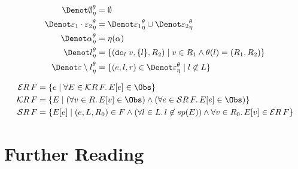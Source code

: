 \begin{alignat*}{2}
  \DenotEnv{\emptyset} & = \emptyset \\
  \DenotEnv{\varepsilon_1 \cdot \varepsilon_2} & = \DenotEnv{\varepsilon_1} \cup \DenotEnv{\varepsilon_2} \\
  \DenotEnv{\alpha} & = \eta(\alpha) \\
  \DenotEnv{l} & = \{(\Do{l}{v}, \{l\}, R_2) \mid v \in R_1 \land \theta(l) = (R_1, R_2) \} \\
  \DenotEnv{\varepsilon \setminus l} & = \{(e, l, r) \in \DenotEnv{\varepsilon} \mid l \not\in L\}
\end{alignat*}

\begin{alignat*}{2}
  \mathcal{E}R\,F & = \{e \mid \forall E \in \mathcal{K}R\,F \ldotp E[e] \in \Obs\} \\
  \mathcal{K}R\,F & = \{E \mid (\forall v \in R \ldotp E[v] \in \Obs) \land (\forall e \in \mathcal{S}R\,F \ldotp E[e] \in \Obs)\} \\
  \mathcal{S}R\,F & = \{E[e] \mid (e, L, R_0) \in F \land (\forall l \in L \ldotp l \not\in sp(E)) \land \forall v \in R_0 \ldotp E[v] \in \mathcal{E}R\,F\}
\end{alignat*}

\section{Further Reading}
